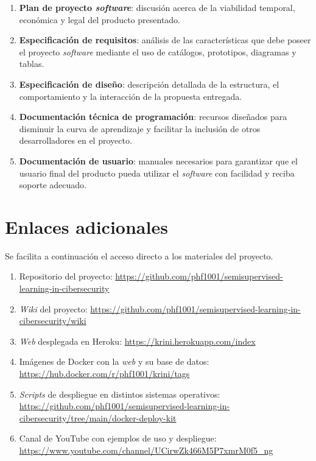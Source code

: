 \begin{enumerate}
	\item \textbf{Plan de proyecto \textit{software}}: discusión acerca de la viabilidad temporal, económica y legal del producto presentado.
	\item \textbf{Especificación de requisitos}: análisis de las características que debe poseer el proyecto \textit{software} mediante el uso de catálogos, prototipos, diagramas y tablas.
	\item \textbf{Especificación de diseño}: descripción detallada de la estructura,
	el comportamiento y la interacción de la propuesta entregada.
	\item \textbf{Documentación técnica de programación}: recursos diseñados para disminuir la curva de aprendizaje y facilitar la inclusión de otros desarrolladores en el proyecto.
	\item \textbf{Documentación de usuario}: manuales necesarios para garantizar que el usuario final del producto pueda utilizar el \textit{software} con facilidad y reciba soporte adecuado.
\end{enumerate} 

\section{Enlaces adicionales}

Se facilita a continuación el acceso directo a los materiales del proyecto.

\begin{enumerate}
	\item Repositorio del proyecto:
	\url{https://github.com/phf1001/semisupervised-learning-in-cibersecurity}
	\item \textit{Wiki} del proyecto: 	\url{https://github.com/phf1001/semisupervised-learning-in-cibersecurity/wiki}
	\item \textit{Web} desplegada en Heroku: \url{https://krini.herokuapp.com/index}
	\item Imágenes de Docker con la \textit{web} y su base de datos: \url{https://hub.docker.com/r/phf1001/krini/tags}
	\item \textit{Scripts} de despliegue en distintos sistemas operativos: \url{https://github.com/phf1001/semisupervised-learning-in-cibersecurity/tree/main/docker-deploy-kit}
	\item Canal de YouTube con ejemplos de uso y despliegue: \url{https://www.youtube.com/channel/UCirwZk466M5P7xmrM0f5_ng}
\end{enumerate}